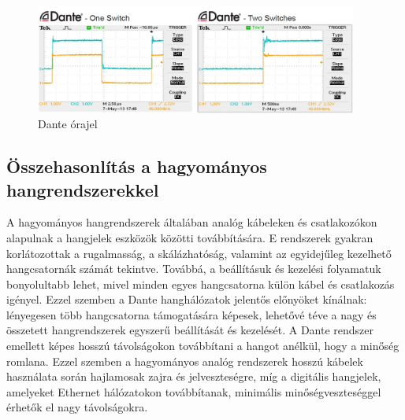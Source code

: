 \begin{figure}[H]
	\centering
	\includegraphics[width=400px, keepaspectratio] {figures/dante-clocking.jpg}
	\caption{Dante órajel}
	\label{fig:dante-clock}
\end{figure}

\subsection{Összehasonlítás a hagyományos hangrendszerekkel}
A hagyományos hangrendszerek általában analóg kábeleken és csatlakozókon alapulnak 
a hangjelek eszközök közötti továbbítására. E rendszerek gyakran korlátozottak 
a rugalmasság, a skálázhatóság, valamint az egyidejűleg kezelhető hangcsatornák 
számát tekintve. Továbbá, a beállításuk és kezelési folyamatuk bonyolultabb lehet, 
mivel minden egyes hangcsatorna külön kábel és csatlakozás igényel. Ezzel szemben 
a Dante hanghálózatok jelentős előnyöket kínálnak: lényegesen több hangcsatorna 
támogatására képesek, lehetővé téve a nagy és összetett hangrendszerek egyszerű 
beállítását és kezelését. A Dante rendszer emellett képes hosszú távolságokon 
továbbítani a hangot anélkül, hogy a minőség romlana. Ezzel szemben a hagyományos 
analóg rendszerek hosszú kábelek használata során hajlamosak zajra és jelveszteségre, 
míg a digitális hangjelek, amelyeket Ethernet hálózatokon továbbítanak, minimális 
minőségveszteséggel érhetők el nagy távolságokra.

